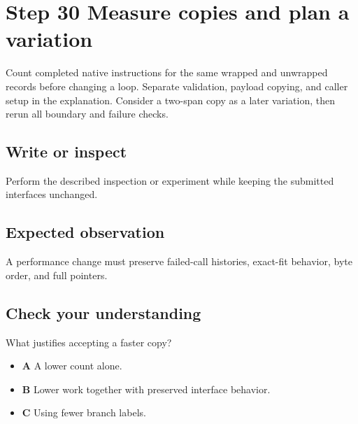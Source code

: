 \section{Step 30 Measure copies and plan a variation}\label{ring-s30}

Count completed native instructions for the same wrapped and unwrapped records before changing a loop. Separate validation, payload copying, and caller setup in the explanation. Consider a two-span copy as a later variation, then rerun all boundary and failure checks.

\subsection{Write or inspect}
Perform the described inspection or experiment while keeping the submitted interfaces unchanged.

\subsection{Expected observation}
A performance change must preserve failed-call histories, exact-fit behavior, byte order, and full pointers.

\subsection{Check your understanding}
What justifies accepting a faster copy?

\begin{itemize}
  \item \textbf{A} A lower count alone.
  \item \textbf{B} Lower work together with preserved interface behavior.
  \item \textbf{C} Using fewer branch labels.
\end{itemize}
